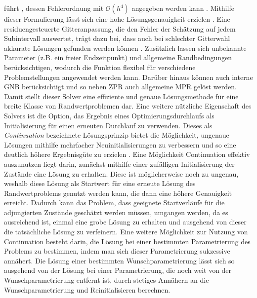 führt \cite{Cash.1980}, dessen Fehlerordnung mit $\mathcal{O}(h^4)$ angegeben werden kann \cite{Kierzenka.2001}. Mithilfe dieser Formulierung lässt sich eine hohe Lösungsgenauigkeit erzielen \cite{Kierzenka.2001}. Eine residuengesteuerte Gitteranpassung, die den Fehler der Schätzung auf jedem Subintervall auswertet, trägt dazu bei, dass auch bei schlechter Gitterwahl akkurate Lösungen gefunden werden können \cite{Kierzenka.2001}. Zusätzlich lassen sich unbekannte Parameter (z.B. ein freier Endzeitpunkt) und allgemeine Randbedingungen berücksichtigen, wodurch die Funktion flexibel für verschiedene Problemstellungen angewendet werden kann. Darüber hinaus können auch interne \gls{GNB} berücksichtigt und so neben \gls{ZPR} auch allgemeine \gls{MPR} gelöst werden. Damit stellt dieser Solver eine effiziente und genaue Lösungsmethode für eine breite Klasse von Randwertproblemen dar. Eine weitere nützliche Eigenschaft des Solvers ist die Option, das Ergebnis eines Optimierungsdurchlaufs als Initialisierung für einen erneuten Durchlauf zu verwenden. Dieses als \textit{Continuation} bezeichnete Lösungsprinzip bietet die Möglichkeit, ungenaue Lösungen mithilfe mehrfacher Neuinitialisierungen zu verbessern und so eine deutlich höhere Ergebnisgüte zu erzielen \cite{Kierzenka.2001}. Eine Möglichkeit Continuation effektiv auszunutzen liegt darin, zunächst mithilfe einer zufälligen Initialisierung der Zustände eine Lösung zu erhalten. Diese ist möglicherweise noch zu ungenau, weshalb diese Lösung als Startwert für eine erneute Lösung des Randwertproblems genutzt werden kann, die dann eine höhere Genauigkeit erreicht. Dadurch kann das Problem, dass geeignete Startverläufe für die adjungierten Zustände geschätzt werden müssen, umgangen werden, da es ausreichend ist, einmal eine grobe Lösung zu erhalten und ausgehend von dieser die tatsächliche Lösung zu verfeinern. Eine weitere Möglichkeit zur Nutzung von Continuation besteht darin, die Lösung bei einer bestimmten Parametrierung des Problems zu bestimmen, indem man sich dieser Parametrierung sukzessive annähert. Die Lösung einer bestimmten Wunschparametrierung lässt sich so ausgehend von der Lösung bei einer Parametrierung, die noch weit von der Wunschparametrierung entfernt ist, durch stetiges Annähern an die Wunschparametrierung und Reinitialisieren berechnen.

